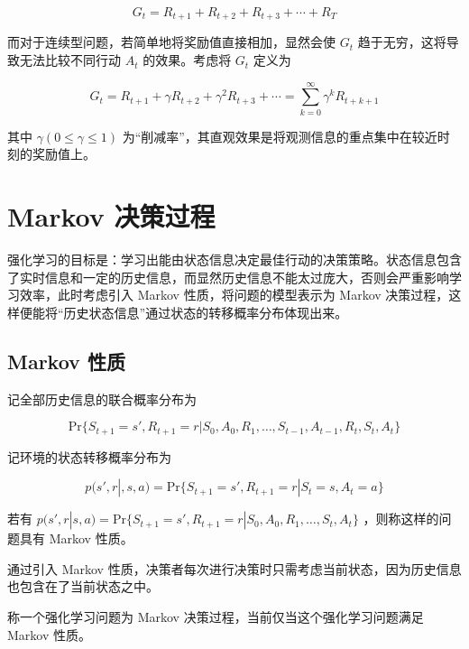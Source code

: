 \begin{equation}
G_t = R_{t+1}+R_{t+2}+R_{t+3}+\cdots+R_T
\end{equation}

而对于连续型问题，若简单地将奖励值直接相加，显然会使 $G_t$ 趋于无穷，这将导致无法比较不同行动 $A_t$ 的效果。考虑将 $G_t$ 定义为

\begin{equation}
G_t = R_{t+1}+\gamma R_{t+2}+\gamma^2 R_{t+3}+\cdots = \sum_{k=0}^{\infty}\gamma^kR_{t+k+1}
\end{equation}

其中 $\gamma(0\leq \gamma \leq 1)$ 为“削减率”，其直观效果是将观测信息的重点集中在较近时刻的奖励值上。

\section{Markov 决策过程}

强化学习的目标是：学习出能由状态信息决定最佳行动的决策策略\cite{sutton2018reinforcement}。状态信息包含了实时信息和一定的历史信息，而显然历史信息不能太过庞大，否则会严重影响学习效率，此时考虑引入 Markov 性质，将问题的模型表示为 Markov 决策过程\cite{howard1960dynamic}，这样便能将“历史状态信息”通过状态的转移概率分布体现出来\cite{ross1996stochastic}。

\subsection{Markov 性质}

记全部历史信息的联合概率分布为

\begin{equation}
    \mathrm{Pr}\{S_{t+1}=s',R_{t+1}=r|S_0,A_0,R_1,\ldots,S_{t-1},A_{t-1},R_t,S_t,A_t\}
\end{equation}

记环境的状态转移概率分布为

\begin{equation}
    p(s',r|,s,a) = \mathrm{Pr}\{S_{t+1}=s',R_{t+1}=r|S_t=s,A_t=a\}
\end{equation}

若有 $p(s',r|s,a) = \mathrm{Pr}\{S_{t+1}=s',R_{t+1}=r|S_0,A_0,R_1,\ldots,S_t,A_t\}$ ，则称这样的问题具有 {\jiacu Markov 性质}。

通过引入 Markov 性质，决策者每次进行决策时只需考虑当前状态，因为历史信息也包含在了当前状态之中。

称一个强化学习问题为 Markov 决策过程，当前仅当这个强化学习问题满足 Markov 性质\cite{sutton2018reinforcement}\cite{howard1960dynamic}。

